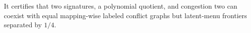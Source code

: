 It certifies that two signatures, a polynomial quotient, and congestion two can coexist with equal mapping-wise labeled conflict graphs but latent-menu frontiers separated by \(1/4\).